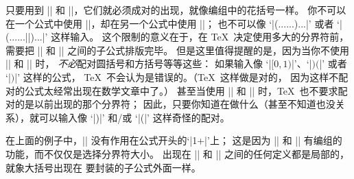 只要用到 |\left| 和 |\right|，它们就必须成对的出现，就像编组中的花括号一样。
你不可以在一个公式中使用 |\left|，却在另一个公式中使用 |\right|；
也不可以像 `|\left(...{...\right)...}|' 或者
`|\left(...\begingroup...|\allowbreak|\right)...\endgroup|' 这样输入。
这个限制的意义在于，在 \TeX\ 决定使用多大的分界符前，
需要把 |\left| 和 |\right| 之间的子公式排版完毕。
但是这里值得提醒的是，因为当你不使用 |\left| 和 |\right| 时，
{\sl 不必}配对圆括号和方括号等等这些：
如果输入像 `|$[0,1)$|'、`|$)($|' 或者 `|$)$|' 这样的公式，
\TeX\ 不会认为是错误的。（\TeX\ 这样做是对的，
因为这样不配对的公式太经常出现在数学文章中了。）%
甚至当使用 |\left| 和 |\right| 时，\TeX\ 也不要求配对的是以前出现的那个分界符；
因此，只要你知道在做什么（甚至不知道也没关系），就可以输入像 `|\left)|'
和/或 `|\right(|' 这样奇怪的配对。

在上面的例子中，|\over| 没有作用在公式开头的`|1+|'上；
这是因为 |\left| 和 |\right| 有编组的功能，而不仅仅是选择分界符大小。%
出现在 |\left| 和 |\right| 之间的任何定义都是局部的，就象大括号出现在%
要封装的子公式外面一样。

